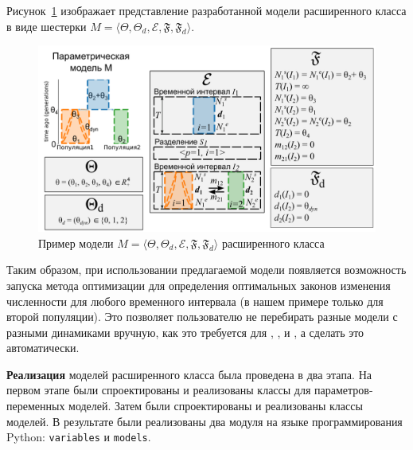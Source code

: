 Рисунок~\ref{fig:model_3_type} изображает представление разработанной модели расширенного класса в виде шестерки  $M = \langle\Theta, \Theta_d, \mathcal{E}, \mathfrak{F}, \mathfrak{F}_{d}\rangle$.

\begin{figure}[ht]
    \centering
    \includegraphics[width=\linewidth]{images_2/model_3_type.pdf}
    \caption{Пример модели $M = \langle\Theta, \Theta_d, \mathcal{E}, \mathfrak{F}, \mathfrak{F}_{d}\rangle$ расширенного класса}
    \label{fig:model_3_type}
\end{figure}

Таким образом, при использовании предлагаемой модели появляется возможность запуска метода оптимизации для определения оптимальных законов изменения численности для любого временного интервала (в нашем примере только для второй популяции). Это позволяет пользователю не перебирать разные модели с разными динамиками вручную, как это требуется для \dadi, \moments, \momentsLD и \momi, а сделать это автоматически.


\textbf{Реализация} моделей расширенного класса была проведена в два этапа.
На первом этапе были спроектированы и реализованы классы для параметров-переменных моделей.
Затем были спроектированы и реализованы классы моделей.
В результате были реализованы два модуля на языке программирования Python: \texttt{variables} и \texttt{models}.

